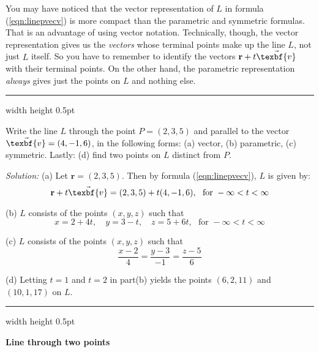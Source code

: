 You may have noticed that the vector representation of $L$ in formula (\ref{eqn:linepvecv}) is more compact than the
parametric and symmetric formulas. That is an advantage of using vector notation. Technically,
though, the vector representation gives us the \emph{vectors} whose terminal points make up the line $L$, not just $L$
itself. So you have to remember to identify the vectors $\textbf{r} + t \vec{\texbf{v}}$ with their terminal points.
On the other hand, the parametric representation \emph{always} gives just the points on $L$ and nothing else.

\vspace{3mm}
\hrule width \textwidth height 0.5pt
\begin{exmp}
 Write the line $L$ through the point $P = (2,3,5)$ and parallel to the vector $\vec{\texbf{v}} = (4,-1,6)$, in the
 following forms: (a) vector, (b) parametric, (c) symmetric. Lastly: (d) find two points on $L$ distinct from
 $P$.\vspace{1mm}
 \par\noindent\emph{Solution:} (a) Let $\textbf{r} = (2,3,5)$. Then by formula (\ref{eqn:linepvecv}), $L$ is given by:
 \begin{displaymath}
  \textbf{r} + t \vec{\texbf{v}} = (2,3,5) + t(4,-1,6), \text{~~for~} -\infty < t < \infty
 \end{displaymath}
 \par\noindent (b) $L$ consists of the points $(x,y,z)$ such that
 \begin{displaymath}
  x = 2 + 4t, \quad y = 3 - t, \quad z = 5 + 6t, \text{~~for~} -\infty < t < \infty
 \end{displaymath}
 \par\noindent (c) $L$ consists of the points $(x,y,z)$ such that
 \begin{displaymath}
  \frac{x - 2}{4} = \frac{y - 3}{-1} = \frac{z - 5}{6}
 \end{displaymath}
 \par\noindent (d) Letting $t=1$ and $t=2$ in part(b) yields the points $(6,2,11)$ and $(10,1,17)$ on $L$.
\end{exmp}
\hrule width \textwidth height 0.5pt
\newpage
\par\noindent\textbf{\large{Line through two points}}\normalsize\vspace{1.5mm}

